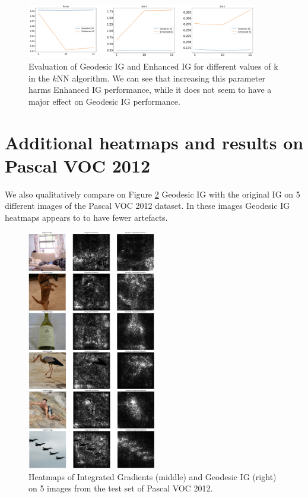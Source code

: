 \begin{figure}[ht]
\vskip 0.2in
\begin{center}
\centerline{\includegraphics[width=0.9\textwidth]{figures/knn.png}}
\caption{Evaluation of Geodesic IG and Enhanced IG for different values of k in the $k$NN algorithm. We can see that increasing this parameter harms Enhanced IG performance, while it does not seem to have a major effect on Geodesic IG performance.}
\label{fig:knn}
\end{center}
\vskip -0.2in
\end{figure}

\newpage

\section{Additional heatmaps and results on Pascal VOC 2012}
\label{app:voc}

We also qualitatively compare on Figure \ref{fig:more_images} Geodesic IG with the original IG on 5 different images of the Pascal VOC 2012 dataset. In these images Geodesic IG heatmaps appears to to have fewer artefacts.

\begin{figure}[ht]
\vskip 0.2in
\begin{center}
\centerline{\includegraphics[width=0.5\textwidth]{figures/more_images.png}}
\caption{Heatmaps of Integrated Gradients (middle) and Geodesic IG (right) on 5 images from the test set of Pascal VOC 2012.}
\label{fig:more_images}
\end{center}
\vskip -0.2in
\end{figure}
